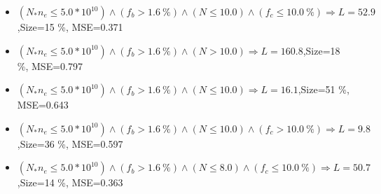 \documentclass[numbered]{CSL}
\begin{document}
\begin{itemize}
\item $(N_* n_e \leq 5.0 * 10^{10}) \land (f_b > 1.6~\%) \land (N \leq 10.0) \land (f_c \leq 10.0~\%) \Rightarrow L = 52.9$,\hfill Size=15 \%, MSE=0.371
\item $(N_* n_e \leq 5.0 * 10^{10}) \land (f_b > 1.6~\%) \land (N > 10.0) \Rightarrow L = 160.8$,\hfill Size=18 \%, MSE=0.797
\item $(N_* n_e \leq 5.0 * 10^{10}) \land (f_b > 1.6~\%) \land (N \leq 10.0) \Rightarrow L = 16.1$,\hfill Size=51 \%, MSE=0.643
\item $(N_* n_e \leq 5.0 * 10^{10}) \land (f_b > 1.6~\%) \land (N \leq 10.0) \land (f_c > 10.0~\%) \Rightarrow L = 9.8$,\hfill Size=36 \%, MSE=0.597
\item $(N_* n_e \leq 5.0 * 10^{10}) \land (f_b > 1.6~\%) \land (N \leq 8.0) \land (f_c \leq 10.0~\%) \Rightarrow L = 50.7$,\hfill Size=14 \%, MSE=0.363
\end{itemize}
\end{document}
